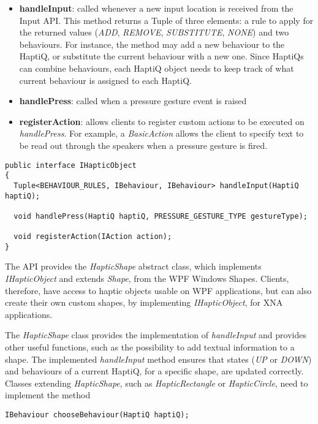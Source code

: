 \begin{itemize}
	\item \textbf{handleInput}: called whenever a new input location is received from the Input API. This method returns a Tuple of three elements: a rule to apply for the returned values (\textit{ADD}, \textit{REMOVE}, \textit{SUBSTITUTE}, \textit{NONE}) and two behaviours. For instance, the method may add a new behaviour to the HaptiQ, or substitute the current behaviour with a new one. Since HaptiQs can combine behaviours, each HaptiQ object needs to keep track of what current behaviour is assigned to each HaptiQ. 
    \item \textbf{handlePress}: called when a pressure gesture event is raised
    \item \textbf{registerAction}: allows clients to register custom actions to be executed on \textit{handlePress}. For example, a \textit{BasicAction} allows the client to specify text to be read out through the speakers when a pressure gesture is fired.
\end{itemize}

\lstset{style=sharpc1}
\begin{lstlisting}[caption={IHapticObject},label={lst:IHapticObject}]
public interface IHapticObject 
{
  Tuple<BEHAVIOUR_RULES, IBehaviour, IBehaviour> handleInput(HaptiQ haptiQ);
  
  void handlePress(HaptiQ haptiQ, PRESSURE_GESTURE_TYPE gestureType);
  
  void registerAction(IAction action);
}
\end{lstlisting}

The API provides the \textit{HapticShape} abstract class, which implements \textit{IHapticObject} and extends \textit{Shape}, from the WPF Windows Shapes. Clients, therefore, have access to haptic objects usable on WPF applications, but can also create their own custom shapes, by implementing \textit{IHapticObject}, for XNA applications. 

The \textit{HapticShape} class provides the implementation of \textit{handleInput} and provides other useful functions, such as the possibility to add textual information to a shape. The implemented \textit{handleInput} method ensures that states (\textit{UP} or \textit{DOWN}) and behaviours of a current HaptiQ, for a specific shape, are updated correctly. Classes extending \textit{HapticShape}, such as \textit{HapticRectangle} or \textit{HapticCircle}, need to implement the method

\lstset{style=sharpc1}
\begin{lstlisting}
IBehaviour chooseBehaviour(HaptiQ haptiQ);
\end{lstlisting}

